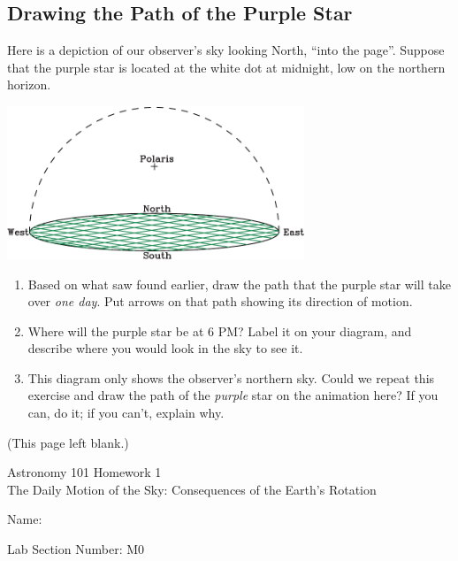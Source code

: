 \documentclass[12pt]{article}
\newcommand{\insp}{\vspace{1in}}
\newcommand{\BS}{\bigskip}
\begin{document}
\subsection{Drawing the Path of the Purple Star}
	\begin{minipage}{0.5\textwidth}Here is a depiction of our observer's sky looking North, ``into the page''. Suppose that the purple star is located at the white dot at midnight, low on the northern horizon. 
	\end{minipage}
\begin{minipage}{0.5\textwidth}	
	\begin{center}
		\includegraphics[width=3.5in]{disk-crop.pdf}
	\end{center}
		\end{minipage}
	\begin{enumerate}
	\item Based on what saw found earlier, draw the path that the purple star will take over {\it one day}. Put arrows on that path showing its direction of motion.
		\BS
		
	\item Where will the purple star be at 6 PM? Label it on your diagram, and describe where you would look in the sky to see it.
	\insp
	
	\item This diagram only shows the observer's northern sky. Could we repeat this exercise and draw the path of the {\it purple} star on the animation here? If you can, do it; if you can't, explain why.
	
	\insp \BS\BS
\end{enumerate}

\newpage

(This page left blank.)

\newpage


\begin{center}
	\sc \Large Astronomy 101 Homework 1 \\ \large The Daily Motion of the Sky: Consequences of the Earth's Rotation
\end{center}
\begin{flushright}
\Large

Name: \underline{\hspace{2.7in}}
\BS

Lab Section Number: M0\underline{\hspace{1in}}
\end{flushright}
\end{document}
